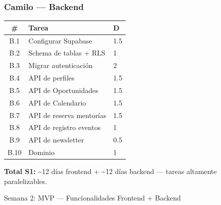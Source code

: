 \documentclass[11pt]{article}
\begin{document}
\begin{minipage}[t]{0.48\textwidth}
  \vspace{0pt}
  \subsubsection*{Camilo --- Backend}
  \begin{table}[h]
    \centering
    \footnotesize
    \renewcommand{\arraystretch}{1.15}
    \begin{tabular}{c L{2.5cm} C{0.5cm}}
      \toprule
      {\color{op-white}\bfseries \#} & {\color{op-white}\bfseries Tarea} & {\color{op-white}\bfseries D} \\
      \midrule
      B.1 & Configurar Supabase & 1.5 \\
      B.2 & Schema de tablas + RLS & 1 \\
      B.3 & Migrar autenticación & 2 \\
      B.4 & API de perfiles & 1.5 \\
      B.5 & API de Oportunidades & 1.5 \\
      B.6 & API de Calendario & 1.5 \\
      B.7 & API de reserva mentorías & 1.5 \\
      B.8 & API de registro eventos & 1 \\
      B.9 & API de newsletter & 0.5 \\
      B.10 & Dominio & 1 \\
      \bottomrule
    \end{tabular}
  \end{table}
\end{minipage}

\vspace{0.2cm}
{\footnotesize\color{op-textmuted} \textbf{Total S1:} \textasciitilde12 días frontend + \textasciitilde12 días backend --- tareas altamente paralelizables.}

\newpage

\begin{tcolorbox}[op-fase]
  \makebox[0pt][l]{\hspace*{-5mm}{\color{op-verde}\rule{2mm}{1.2em}}}%
  \hspace{3mm} Semana 2: MVP --- Funcionalidades Frontend + Backend
\end{tcolorbox}
\end{document}
